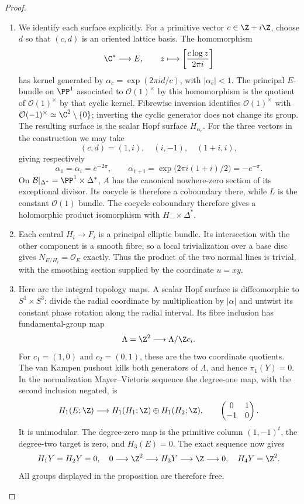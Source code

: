 \begin{proof}
\begin{enumerate}[label=\arabic*.,leftmargin=*]
\item We identify each surface explicitly.  For a primitive vector
$c\in\Z+i\Z$, choose $d$ so that $(c,d)$ is an oriented
lattice basis.  The homomorphism
\[
 \C^*\longrightarrow E,\qquad
 z\longmapsto\left[\frac{c\log z}{2\pi i}\right]
\]
has kernel generated by
$\alpha_c=\exp(2\pi i d/c)$, with $|\alpha_c|<1$.
The principal $E$-bundle on $\PP^1$ associated to
$\mathcal O(1)^\times$ by this homomorphism is the quotient
of $\mathcal O(1)^\times$ by that cyclic kernel.  Fibrewise
inversion identifies $\mathcal O(1)^\times$ with
$\mathcal O(-1)^\times\simeq\C^2\setminus\{0\}$;
inverting the cyclic generator does not change its group.
The resulting surface is the scalar Hopf surface $H_{\alpha_c}$.
For the three vectors in the construction we may take
\[
 (c,d)=(1,i),\quad(i,-1),\quad(1+i,i),
\]
giving respectively
\[
 \alpha_1=\alpha_i=e^{-2\pi},\qquad
 \alpha_{1+i}=\exp\bigl(2\pi i(1+i)/2\bigr)=-e^{-\pi}.
\]
On $\mathcal B|_{\Delta^*}=\PP^1\times\Delta^*$,
$A$ has the canonical nowhere-zero section of its exceptional
divisor.  Its cocycle is therefore a coboundary there, while
$L$ is the constant $\mathcal O(1)$ bundle.  The cocycle coboundary therefore gives a holomorphic product
isomorphism with $H_-\times\Delta^*$.

\item Each central $H_i\to F_i$ is a principal elliptic bundle.
Its intersection with the other component is a smooth fibre,
so a local trivialization over a base disc gives
$N_{E/H_i}=\mathcal O_E$ exactly.  Thus the product of the
two normal lines is trivial, with the smoothing section supplied
by the coordinate $u=xy$.

\item Here are the integral topology maps.  A scalar Hopf surface is
diffeomorphic to $S^1\times S^3$: divide the radial coordinate
by multiplication by $|\alpha|$ and untwist its constant phase
rotation along the radial interval.  Its fibre inclusion has
fundamental-group map
\[
 \Lambda=\Z^2\longrightarrow\Lambda/\Z c_i.
\]
For $c_1=(1,0)$ and $c_2=(0,1)$, these are the two coordinate
quotients.  The van Kampen pushout kills both generators of
$\Lambda$, and hence $\pi_1(Y)=0$.  In the normalization
Mayer--Vietoris sequence the degree-one map, with the second
inclusion negated, is
\[
 H_1(E;\Z)\longrightarrow H_1(H_1;\Z)\oplus H_1(H_2;\Z),
 \qquad \begin{pmatrix}0&1\\-1&0\end{pmatrix}.
\]
It is unimodular.  The degree-zero map is the primitive column
$(1,-1)^t$, the degree-two target is zero, and $H_3(E)=0$.
The exact sequence now gives
\[
 H_1Y=H_2Y=0,\quad
 0\longrightarrow\Z^2\longrightarrow H_3Y
       \longrightarrow\Z\longrightarrow0,
 \quad H_4Y=\Z^2.
\]
All groups displayed in the proposition are therefore free.


\end{enumerate}
\end{proof}
